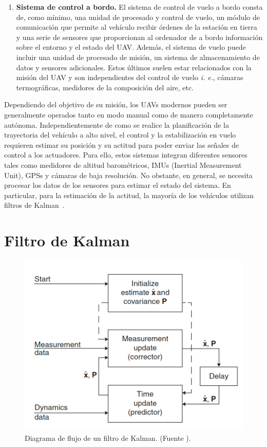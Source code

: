 \documentclass[a4paper,12pt]{book}
\begin{document}
\begin{enumerate}
    \item \textbf{Sistema de control a bordo.} El sistema de control de vuelo a bordo consta de, como mínimo, una unidad de procesado y control de vuelo, un módulo de comunicación que permite al vehículo recibir órdenes de la estación en tierra y una serie de sensores que proporcionan al ordenador de a bordo información sobre el entorno y el estado del UAV. Además, el sistema de vuelo puede incluir una unidad de procesado de misión, un sistema de almacenamiento de datos y sensores adicionales. Estos últimos suelen estar relacionados con la misión del UAV y son independientes del control de vuelo \emph{i. e.}, cámaras termográficas, medidores de la composición del aire, etc.
\end{enumerate}




Dependiendo del objetivo de su misión, los UAVs modernos pueden ser generalmente operados tanto en modo manual como de manera completamente autónoma. Independientemente de como se realice la planificación de la trayectoria del vehículo a alto nivel, el control y la estabilización en vuelo requieren estimar su posición y su actitud para poder enviar las señales de control a los actuadores. Para ello, estos sistemas integran diferentes sensores tales como medidores de altitud barométricos, IMUs (Inertial Measurement Unit), GPSs y cámaras de baja resolución. No obstante, en general, se necesita procesar los datos de los sensores para  estimar el estado del sistema. En particular, para la estimación de la actitud, la mayoría de los vehículos utilizan filtros de Kalman~\cite{zhang2005navigation, pettersson2015extended, trawny2005indirect}.

\section{Filtro de Kalman}

\begin{figure}[!ht]
    \centering
	\includegraphics[width=0.6\linewidth]{Figures/Kalman_filter_diagram.png}
 	\caption{Diagrama de flujo de un filtro de Kalman. (Fuente \cite{grewal2020kalman}).}
 	\label{fig:Kalman_filter_diagram}
\end{figure}
\end{document}
